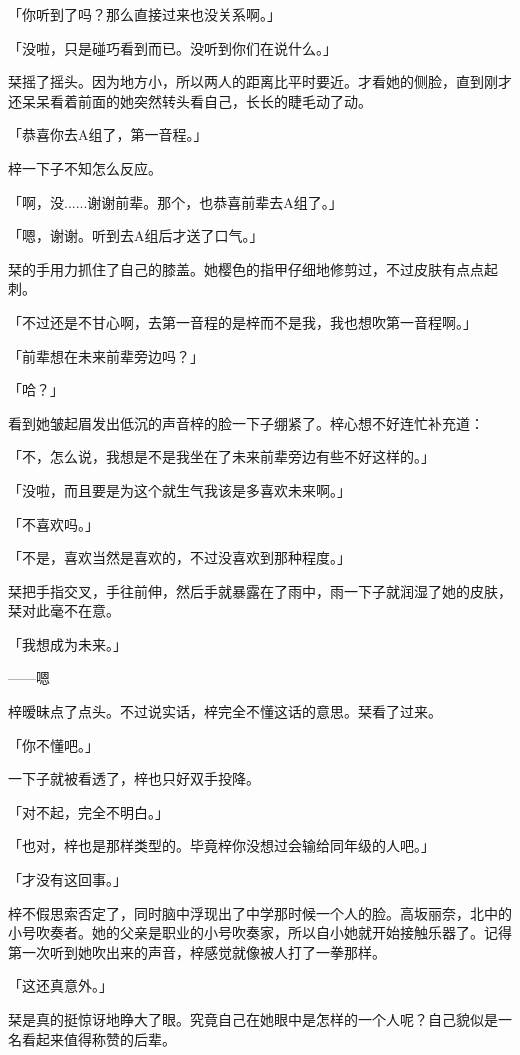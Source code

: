 \documentclass[UTF8]{ctexart}
\begin{document}
    「你听到了吗？那么直接过来也没关系啊。」

    「没啦，只是碰巧看到而已。没听到你们在说什么。」

    栞摇了摇头。因为地方小，所以两人的距离比平时要近。才看她的侧脸，直到刚才还呆呆看着前面的她突然转头看自己，长长的睫毛动了动。

    「恭喜你去A组了，第一音程。」

    梓一下子不知怎么反应。

    「啊，没......谢谢前辈。那个，也恭喜前辈去A组了。」

    「嗯，谢谢。听到去A组后才送了口气。」

    栞的手用力抓住了自己的膝盖。她樱色的指甲仔细地修剪过，不过皮肤有点点起刺。

    「不过还是不甘心啊，去第一音程的是梓而不是我，我也想吹第一音程啊。」

    「前辈想在未来前辈旁边吗？」

    「哈？」

    看到她皱起眉发出低沉的声音梓的脸一下子绷紧了。梓心想不好连忙补充道：

    「不，怎么说，我想是不是我坐在了未来前辈旁边有些不好这样的。」

    「没啦，而且要是为这个就生气我该是多喜欢未来啊。」

    「不喜欢吗。」

    「不是，喜欢当然是喜欢的，不过没喜欢到那种程度。」

    栞把手指交叉，手往前伸，然后手就暴露在了雨中，雨一下子就润湿了她的皮肤，栞对此毫不在意。

    「我想成为未来。」

    ——嗯

    梓暧昧点了点头。不过说实话，梓完全不懂这话的意思。栞看了过来。

    「你不懂吧。」

    一下子就被看透了，梓也只好双手投降。

    「对不起，完全不明白。」

    「也对，梓也是那样类型的。毕竟梓你没想过会输给同年级的人吧。」

    「才没有这回事。」

    梓不假思索否定了，同时脑中浮现出了中学那时候一个人的脸。高坂丽奈，北中的小号吹奏者。她的父亲是职业的小号吹奏家，所以自小她就开始接触乐器了。记得第一次听到她吹出来的声音，梓感觉就像被人打了一拳那样。

    「这还真意外。」

    栞是真的挺惊讶地睁大了眼。究竟自己在她眼中是怎样的一个人呢？自己貌似是一名看起来值得称赞的后辈。
\end{document}
